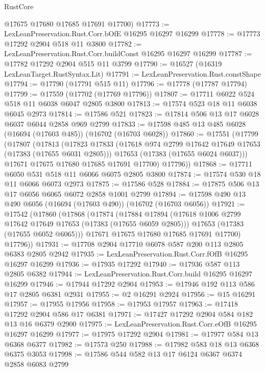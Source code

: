 \begin{lexlean}{RustCore}
\begin{coremodule}
      @17675
      @17680
      @17685
      @17691
      @17700)
@17773 := LexLeanPreservation.Rust.Corr.bOfE @16295 @16297 @16299
@17778 := @17773 @17292 @2904 @518 @11 @3800
@17782 := LexLeanPreservation.Rust.Corr.buildConst @16295 @16297 @16299
@17787 := @17782 @17292 @2904 @515 @11 @3799
@17790 := @16527 (@16319 LexLeanTarget.RustSyntax.Lit)
@17791 := LexLeanPreservation.Rust.constShape
@17794 := @17790 (@17791 @515 @11)
@17796 := @17778 (@17787 @17794)
@17799 := @17559 (@17702 (@17769 @17796))
@17807 := @17711 @6022 @524 @518 @11 @6038 @6047 @2805 @3800
@17813 := @17574 @523 @18 @11 @6038 @6045 @2973
@17814 := @17586 @521
@17823 := @17814 @506 @13 @17 @6028 @6037 @6044 @2858 @969 @2799
@17833 := @17598 @485 @13 @485 @6028 (@16694 (@17603 @485)) (@16702 (@16703 @6028))
@17860 := @17551
    (@17799
      (@17807
        (@17813
          (@17823
            @17833
            (@17618 @974 @2799 @17642 @17649 @17653 (@17383 (@17655 @6031 @2805)))
            @17653
            (@17383 (@17655 @6024 @6037)))
          @17671
          @17675
          @17680
          @17685
          @17691
          @17700)
        @17796))
@17868 := @17711 @6050 @531 @518 @11 @6066 @6075 @2805 @3800
@17874 := @17574 @530 @18 @11 @6066 @6073 @2973
@17875 := @17586 @528
@17884 := @17875 @506 @13 @17 @6056 @6065 @6072 @2858 @1001 @2799
@17894 := @17598 @490 @13 @490 @6056 (@16694 (@17603 @490)) (@16702 (@16703 @6056))
@17921 := @17542
    (@17860
      (@17868
        (@17874
          (@17884
            @17894
            (@17618 @1006 @2799 @17642 @17649 @17653 (@17383 (@17655 @6059 @2805)))
            @17653
            (@17383 (@17655 @6052 @6065)))
          @17671
          @17675
          @17680
          @17685
          @17691
          @17700)
        @17796))
@17931 := @17708 @2904 @17710 @6078 @587 @200 @113 @2805 @6383 @2805 @2942
@17935 := LexLeanPreservation.Rust.Corr.fOfB @16295 @16297 @16299
@17936 := @17935 @17292
@17940 := @17936 @587 @113 @2805 @6382
@17944 := LexLeanPreservation.Rust.Corr.build @16295 @16297 @16299
@17946 := @17944 @17292 @2904
@17953 := @17946 @192 @113 @586 @17 @2805 @6381 @2931
@17955 := @2 @16291 @2924
@17956 := @15 @16291
@17957 := @17955 @17956
@17958 := @17953 @17957
@17963 := @17418 @17292 @2904 @586 @17 @6381
@17971 := @17427 @17292 @2904 @584 @182 @13 @16 @6379 @2900
@17975 := LexLeanPreservation.Rust.Corr.eOfB @16295 @16297 @16299
@17977 := @17975 @17292 @2904
@17981 := @17977 @584 @13 @6368 @6377
@17982 := @17573 @250
@17988 := @17982 @583 @18 @13 @6368 @6375 @3053
@17998 := @17586 @544 @582 @13 @17 @6124 @6367 @6374 @2858 @6083 @2799

\end{coremodule}
\end{lexlean}
